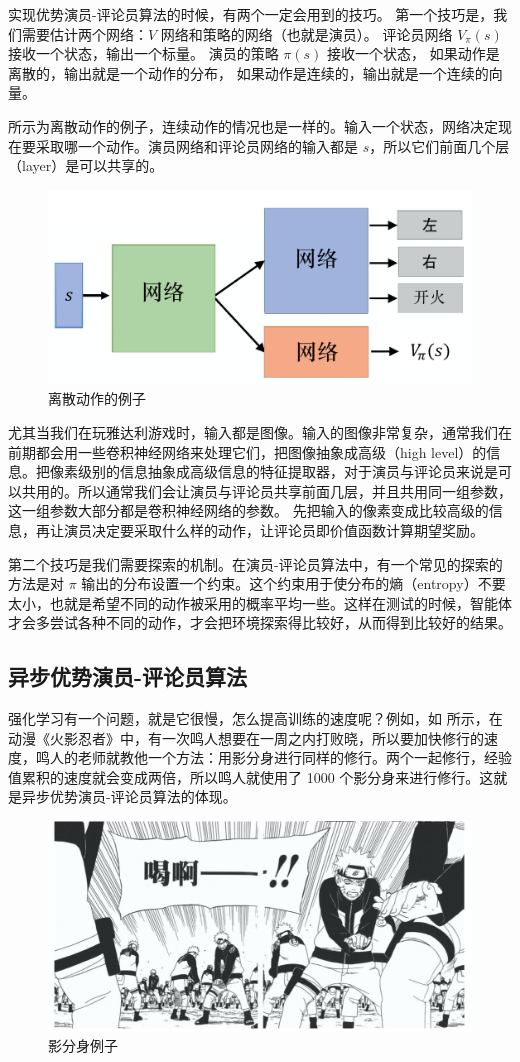 实现优势演员-评论员算法的时候，有两个一定会用到的技巧。
第一个技巧是，我们需要估计两个网络：$V$ 网络和策略的网络（也就是演员）。
  评论员网络 $V_\pi(s)$ 接收一个状态，输出一个标量。
  演员的策略 $\pi(s)$ 接收一个状态，
  如果动作是离散的，输出就是一个动作的分布，
  如果动作是连续的，输出就是一个连续的向量。

 所示为离散动作的例子，连续动作的情况也是一样的。输入一个状态，网络决定现在要采取哪一个动作。演员网络和评论员网络的输入都是 $s$，所以它们前面几个层（layer）是可以共享的。
\begin{figure}[h]
  \centering
  \includegraphics[width=0.5\linewidth]{res/ch9/9.6}
  \caption{离散动作的例子}
  \label{fig:fig9.6}
\end{figure}

尤其当我们在玩雅达利游戏时，输入都是图像。输入的图像非常复杂，通常我们在前期都会用一些卷积神经网络来处理它们，把图像抽象成高级（high level）的信息。把像素级别的信息抽象成高级信息的特征提取器，对于演员与评论员来说是可以共用的。所以通常我们会让演员与评论员共享前面几层，并且共用同一组参数，这一组参数大部分都是卷积神经网络的参数。
先把输入的像素变成比较高级的信息，再让演员决定要采取什么样的动作，让评论员即价值函数计算期望奖励。

第二个技巧是我们需要探索的机制。在演员-评论员算法中，有一个常见的探索的方法是对 $\pi$ 输出的分布设置一个约束。这个约束用于使分布的熵（entropy）不要太小，也就是希望不同的动作被采用的概率平均一些。这样在测试的时候，智能体才会多尝试各种不同的动作，才会把环境探索得比较好，从而得到比较好的结果。

\subsection{异步优势演员-评论员算法} 
强化学习有一个问题，就是它很慢，怎么提高训练的速度呢？例如，如 所示，在动漫《火影忍者》中，有一次鸣人想要在一周之内打败晓，所以要加快修行的速度，鸣人的老师就教他一个方法：用影分身进行同样的修行。两个一起修行，经验值累积的速度就会变成两倍，所以鸣人就使用了 1000 个影分身来进行修行。这就是异步优势演员-评论员算法的体现。
\begin{figure}[hbt]
    \centering
    \includegraphics[width=0.5\linewidth]{res/ch9/9.7}
    \caption{影分身例子}
    \label{fig:fig9.7}
\end{figure}

